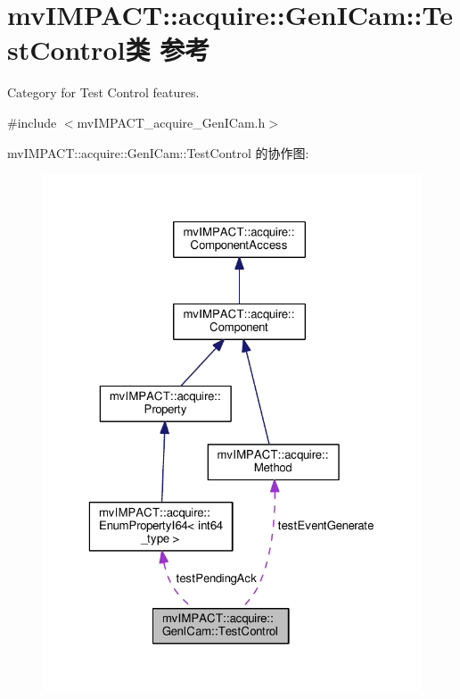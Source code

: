 \hypertarget{classmv_i_m_p_a_c_t_1_1acquire_1_1_gen_i_cam_1_1_test_control}{\section{mv\+I\+M\+P\+A\+C\+T\+:\+:acquire\+:\+:Gen\+I\+Cam\+:\+:Test\+Control类 参考}
\label{classmv_i_m_p_a_c_t_1_1acquire_1_1_gen_i_cam_1_1_test_control}
}


Category for Test Control features.  




{\ttfamily \#include $<$mv\+I\+M\+P\+A\+C\+T\+\_\+acquire\+\_\+\+Gen\+I\+Cam.\+h$>$}



mv\+I\+M\+P\+A\+C\+T\+:\+:acquire\+:\+:Gen\+I\+Cam\+:\+:Test\+Control 的协作图\+:
\nopagebreak
\begin{figure}[H]
\begin{center}
\leavevmode
\includegraphics[width=323pt]{classmv_i_m_p_a_c_t_1_1acquire_1_1_gen_i_cam_1_1_test_control__coll__graph}
\end{center}
\end{figure}
